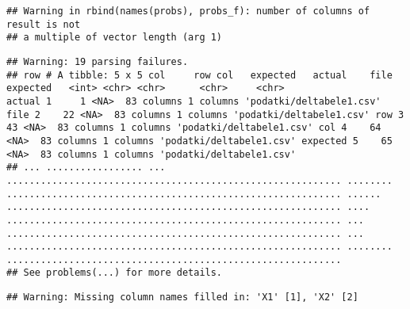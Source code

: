 \documentclass[]{article}
\begin{document}
\begin{verbatim}
## Warning in rbind(names(probs), probs_f): number of columns of result is not
## a multiple of vector length (arg 1)
\end{verbatim}

\begin{verbatim}
## Warning: 19 parsing failures.
## row # A tibble: 5 x 5 col     row col   expected   actual    file                     expected   <int> <chr> <chr>      <chr>     <chr>                    actual 1     1 <NA>  83 columns 1 columns 'podatki/deltabele1.csv' file 2    22 <NA>  83 columns 1 columns 'podatki/deltabele1.csv' row 3    43 <NA>  83 columns 1 columns 'podatki/deltabele1.csv' col 4    64 <NA>  83 columns 1 columns 'podatki/deltabele1.csv' expected 5    65 <NA>  83 columns 1 columns 'podatki/deltabele1.csv'
## ... ................. ... ........................................................... ........ ........................................................... ...... ........................................................... .... ........................................................... ... ........................................................... ... ........................................................... ........ ...........................................................
## See problems(...) for more details.
\end{verbatim}

\begin{verbatim}
## Warning: Missing column names filled in: 'X1' [1], 'X2' [2]
\end{verbatim}
\end{document}
